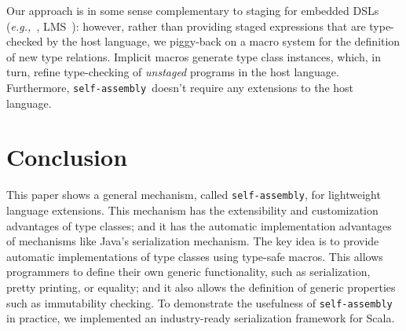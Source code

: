 \documentclass[preprint,nocopyrightspace]{sigplanconf}
\newcommand{\eg}{{\em e.g.,~}}
\newcommand{\selfassembly}{\texttt{self-assembly~}}
\newcommand{\sselfassembly}{\texttt{self-assembly}}
\begin{document}
Our approach is in some sense complementary to staging for embedded DSLs (\eg,
LMS~\cite{LMS}): however, rather than providing staged expressions that are
type-checked by the host language, we piggy-back on a macro system for the
definition of new type relations. Implicit macros generate type class
instances, which, in turn, refine type-checking of {\em unstaged} programs in
the host language. Furthermore, \selfassembly doesn't require any
extensions to the host language.




\section{Conclusion}

This paper shows a general mechanism, called \sselfassembly, for
lightweight language extensions. This mechanism has the extensibility
and customization advantages of type classes; and it has the automatic
implementation advantages of mechanisms like Java's serialization
mechanism.  The key idea is to provide
automatic implementations of type classes using type-safe macros.
This allows programmers to define their own generic
functionality, such as serialization, pretty printing, or equality;
and it also allows the definition of generic properties such as
immutability checking. To demonstrate the usefulness of \selfassembly
in practice, we implemented an industry-ready
serialization framework for Scala.


\end{document}
